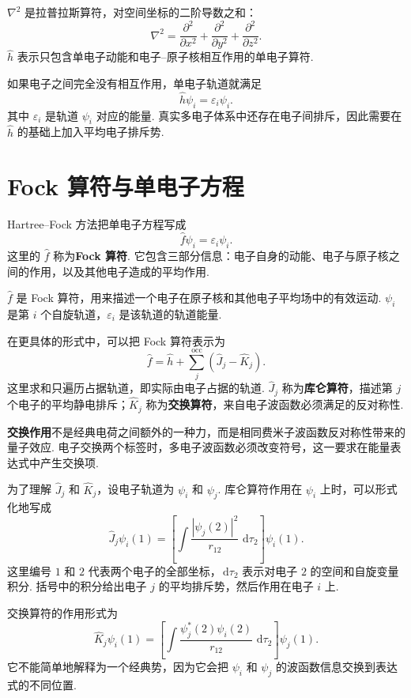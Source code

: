 \documentclass[UTF8,11pt,a4paper,openany]{ctexbook}
\newcommand{\dd}{\,\mathrm d}\newcommand{\Ham}{\hat H}\newcommand{\tr}{\operatorname{Tr}}
\newcommand{\term}[1]{\textbf{#1}}
\begin{document}
\begin{notationbox}
$\nabla^2$ 是拉普拉斯算符，对空间坐标的二阶导数之和：
\[
\nabla^2=\frac{\partial^2}{\partial x^2}
+\frac{\partial^2}{\partial y^2}
+\frac{\partial^2}{\partial z^2}.
\]
$\hat h$ 表示只包含单电子动能和电子--原子核相互作用的单电子算符. 
\end{notationbox}

如果电子之间完全没有相互作用，单电子轨道就满足
\[
\hat h\psi_i=\varepsilon_i\psi_i.
\]
其中 $\varepsilon_i$ 是轨道 $\psi_i$ 对应的能量. 真实多电子体系中还存在电子间排斥，因此需要在 $\hat h$ 的基础上加入平均电子排斥势. 

\section{Fock 算符与单电子方程}

Hartree--Fock 方法把单电子方程写成
\[
\hat f\psi_i=\varepsilon_i\psi_i.
\]
这里的 $\hat f$ 称为\term{Fock 算符}. 它包含三部分信息：电子自身的动能、电子与原子核之间的作用，以及其他电子造成的平均作用. 

\begin{notationbox}
$\hat f$ 是 Fock 算符，用来描述一个电子在原子核和其他电子平均场中的有效运动. $\psi_i$ 是第 $i$ 个自旋轨道，$\varepsilon_i$ 是该轨道的轨道能量. 
\end{notationbox}

在更具体的形式中，可以把 Fock 算符表示为
\[
\hat f=\hat h+\sum_{j}^{\mathrm{occ}}\left(\hat J_j-\hat K_j\right).
\]
这里求和只遍历占据轨道，即实际由电子占据的轨道. $\hat J_j$ 称为\term{库仑算符}，描述第 $j$ 个电子的平均静电排斥；$\hat K_j$ 称为\term{交换算符}，来自电子波函数必须满足的反对称性. 

\begin{definitionbox}
\term{交换作用}不是经典电荷之间额外的一种力，而是相同费米子波函数反对称性带来的量子效应. 电子交换两个标签时，多电子波函数必须改变符号，这一要求在能量表达式中产生交换项. 
\end{definitionbox}

为了理解 $\hat J_j$ 和 $\hat K_j$，设电子轨道为 $\psi_i$ 和 $\psi_j$. 库仑算符作用在 $\psi_i$ 上时，可以形式化地写成
\[
\hat J_j\psi_i(1)
=
\left[
\int
\frac{|\psi_j(2)|^2}{r_{12}}
\,\dd\tau_2
\right]\psi_i(1).
\]
这里编号 $1$ 和 $2$ 代表两个电子的全部坐标，$\dd\tau_2$ 表示对电子 $2$ 的空间和自旋变量积分. 括号中的积分给出电子 $j$ 的平均排斥势，然后作用在电子 $i$ 上. 

交换算符的作用形式为
\[
\hat K_j\psi_i(1)
=
\left[
\int
\frac{\psi_j^*(2)\psi_i(2)}{r_{12}}
\,\dd\tau_2
\right]\psi_j(1).
\]
它不能简单地解释为一个经典势，因为它会把 $\psi_i$ 和 $\psi_j$ 的波函数信息交换到表达式的不同位置. 
\end{document}
